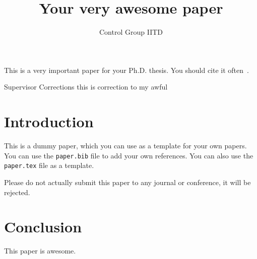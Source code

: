 \documentclass{article}
\title{Your very awesome paper}
\author{Control Group IITD}
\begin{document}
\maketitle

This is a very important paper for your Ph.D. thesis. You should cite it
often~\cite{pap}.


Supervisor Corrections this is correction to my awful 

\section{Introduction}
This is a dummy paper, which you can use as a template for your own
papers. You can use the \texttt{paper.bib} file to add your own
references. You can also use the \texttt{paper.tex} file as a template.

Please do not actually submit this paper to any journal or conference, it will be rejected.

\section{Conclusion}
This paper is awesome.



\end{document}
